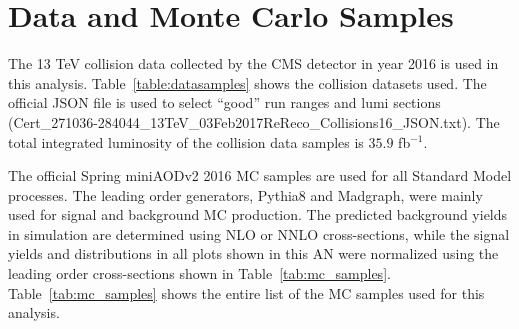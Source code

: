 \section{Data and Monte Carlo Samples}\label{sec:samples}

The 13 TeV collision data collected by the CMS detector in year 2016 is used in this analysis. Table~\ref{table:datasamples} shows the collision datasets used. 
The official JSON file is used to select ``good'' run ranges and lumi sections (Cert\_271036-284044\_13TeV\_03Feb2017ReReco\_Collisions16\_JSON.txt). The total integrated luminosity of the collision 
data 
samples is $35.9$ fb$^{-1}$.

The official Spring miniAODv2 2016 MC samples are used for all Standard Model processes. The leading order generators, {\sc Pythia8} and {\sc Madgraph}, were 
mainly used for signal and background MC production. The predicted background yields in simulation are determined using NLO or NNLO cross-sections, while the 
signal yields and distributions in all plots shown in this AN were normalized using the leading order cross-sections shown in Table~\ref{tab:mc_samples}. 
Table~\ref{tab:mc_samples} shows the entire list of the MC samples used for this analysis. 

